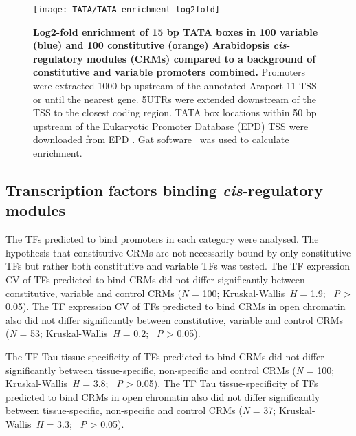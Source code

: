 \documentclass[../main.tex]{subfiles}
\begin{document}
\begin{figure}[!h]
	\begin{center}
		\capstart
		\texttt{[image: TATA/TATA\_enrichment\_log2fold]}
		\caption{
			\textbf{Log2\hyp{}fold enrichment of 15 bp TATA boxes in 100 variable (blue) and 100 constitutive (orange) Arabidopsis \textit{cis}\hyp{}regulatory modules (CRMs) compared to a background of constitutive and variable promoters combined.}
			Promoters were extracted 1000 bp upstream of the annotated Araport 11 \autocite{chengAraport11CompleteReannotation2017} TSS or until the nearest gene.
			5UTRs were extended downstream of the TSS to the closest coding region.
			TATA box locations within 50 bp upstream of the Eukaryotic Promoter Database (EPD) TSS were downloaded from EPD \autocite{dreosInfluenceRotationalNucleosome2016}.
			 Gat software~\autocite{hegerGATSimulationFramework2013} was used to calculate enrichment.
			\label{fig:tata-enrichment}
		}
	\end{center}
\end{figure}

\subsection{Transcription factors binding \textit{cis}\hyp{}regulatory modules}
The TFs predicted to bind promoters in each category were analysed.
The hypothesis that constitutive CRMs are not necessarily bound by only constitutive TFs but rather both constitutive and variable TFs was tested.
The TF expression CV of TFs predicted to bind CRMs did not differ significantly between constitutive, variable and control CRMs (\textit{N} = 100; Kruskal\hyp{}Wallis~\textit{H} = 1.9; ~\textit{P} \textgreater{} 0.05).
The TF expression CV of TFs predicted to bind CRMs in open chromatin also did not differ significantly between constitutive, variable and control CRMs (\textit{N} = 53; Kruskal\hyp{}Wallis~\textit{H} = 0.2; ~\textit{P} \textgreater{} 0.05).

The TF Tau tissue\hyp{}specificity of TFs predicted to bind CRMs did not differ significantly between tissue\hyp{}specific, non\hyp{}specific and control CRMs (\textit{N} = 100; Kruskal\hyp{}Wallis~\textit{H} = 3.8; ~\textit{P} \textgreater{} 0.05).
The TF Tau tissue\hyp{}specificity of TFs predicted to bind CRMs in open chromatin also did not differ significantly between tissue\hyp{}specific, non\hyp{}specific and control CRMs (\textit{N} = 37; Kruskal\hyp{}Wallis~\textit{H} = 3.3; ~\textit{P} \textgreater{} 0.05).
\end{document}
